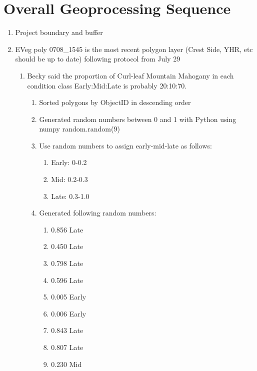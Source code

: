 \section{Overall Geoprocessing Sequence}
\begin{enumerate}
\item Project boundary and buffer
\item EVeg poly 0708\_1545 is the most recent polygon layer (Crest Side, YHR, etc should be up to date) following protocol from July 29
    \begin{enumerate}
        \item Becky said the proportion of Curl-leaf Mountain Mahogany in each condition class Early:Mid:Late is probably 20:10:70.
            \begin{enumerate}
            \item Sorted polygons by ObjectID in descending order
            \item Generated random numbers between 0 and 1 with Python using numpy random.random(9)
            \item Use random numbers to assign early-mid-late as follows:
                \begin{enumerate}
                    \item Early: 0-0.2
                    \item Mid: 0.2-0.3
                    \item Late: 0.3-1.0
                \end{enumerate} 
            \item Generated following random numbers:
                \begin{enumerate}
                    \item 0.856 \textrightarrow Late
                    \item 0.450 \textrightarrow Late
                    \item 0.798 \textrightarrow Late
                    \item 0.596 \textrightarrow Late
                    \item 0.005 \textrightarrow Early
                    \item 0.006 \textrightarrow Early
                    \item 0.843 \textrightarrow Late
                    \item 0.807 \textrightarrow Late
                    \item 0.230 \textrightarrow Mid
                \end{enumerate}
            \end{enumerate}


\end{enumerate}
\end{enumerate}
